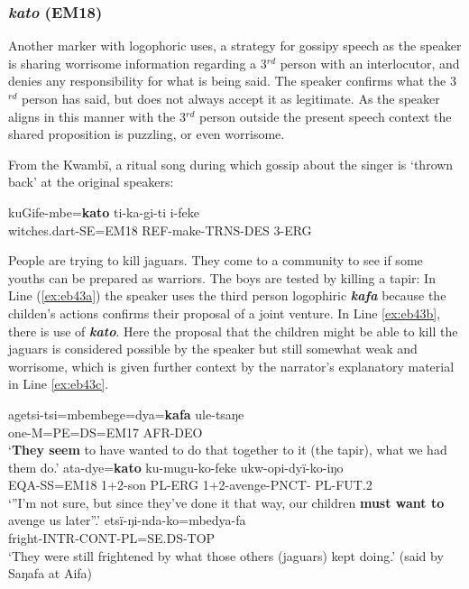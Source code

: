 \documentclass[output=paper]{langsci/langscibook}
\begin{document}
\subsubsection{\textit{kato} (EM18)}  
Another marker with logophoric uses, a strategy for gossipy speech as the speaker is sharing worrisome information regarding a 3$^{rd}$ person with  an interlocutor,  and denies any responsibility for what is being said. The speaker confirms what the 3$^{rd}$  person has said,  but does not always accept it as legitimate.  As the speaker aligns in this manner with the 3$^{rd}$ person outside the present speech context the shared proposition is puzzling, or even worrisome. 

From the Kwambï,  a ritual song during which gossip about the singer is ‘thrown back’ at the original speakers:

\begin{exe}
	\ex \label{ex:eb42}
	\gll kuGife-mbe=\textbf{kato} ti-ka-gi-ti i-feke\\
	witches.dart-SE=EM18 REF-make-TRNS-DES 3-ERG\\
	\trans 
\end{exe}

People are trying to kill jaguars. They come to a community to see if some youths can be prepared as warriors. The boys are tested by killing a tapir:  In Line (\ref{ex:eb43a}) the speaker uses the third person logophiric \textbf{\textit{kafa}} because the childen’s actions confirms their proposal of a joint venture.  In Line \ref{ex:eb43b}, there is use of \textbf{\textit{kato}}. Here the proposal that the children might be able to kill the jaguars is considered possible by the speaker but still somewhat weak and worrisome, which is given further context by the narrator’s explanatory material in Line \ref{ex:eb43c}.

\begin{exe}
\ex \label{ex:eb43}
	\begin{xlist}
	\ex \label{ex:eb43a}
	\gll agetsi-tsi=mbembege=dya=\textbf{kafa} ule-tsaŋe\\
	one-M=PE=DS=EM17 AFR-DEO\\
	\trans ‘\textbf{They seem} to have wanted to do that together to it (the tapir),  what  we had them do.’
	\ex \label{ex:eb43b}
	\gll ata-dye=\textbf{kato} ku-mugu-ko-feke ukw-opi-dyï-ko-iŋo\\
	EQA-SS=EM18 1+2-son PL-ERG 1+2-avenge-PNCT- PL-FUT.2\\
	\trans ‘”I’m not sure, but since they’ve done it that way,  our children \textbf{must want to} avenge us later”.’
	\ex \label{ex:eb43c}
	\gll etsï-ŋi-nda-ko=mbedya-fa\\
	fright-INTR-CONT-PL=SE.DS-TOP\\
	\trans ‘They were still frightened by what those others (jaguars) kept doing.’ (said by Saŋafa  at Aifa)
\end{xlist}
\end{exe}
\end{document}
